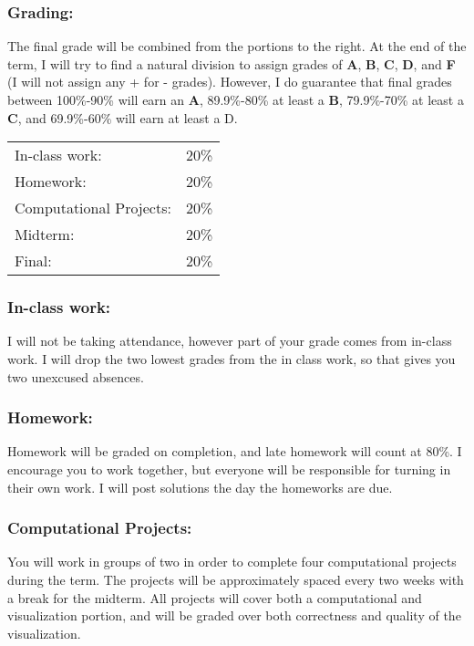 \documentclass[10pt]{article}
\begin{document}
\subsubsection*{Grading:}
\begin{minipage}{0.67\textwidth}
The final grade will be combined from the portions to the right. At the end of the term, I will try to find a natural division to assign grades of {\bf A}, {\bf B}, {\bf C}, {\bf D}, and {\bf F} (I will not assign any + for - grades). However, I do guarantee that final grades between 100\%-90\% will earn an {\bf A}, 89.9\%-80\% at least a {\bf B}, 79.9\%-70\% at least a {\bf C}, and 69.9\%-60\% will earn at least a {D}.
\end{minipage}
\begin{minipage}{0.03\textwidth}
\mbox{\hspace{0.1in}}
\end{minipage}
\begin{minipage}{0.3\textwidth}
\begin{tabular}{ll}
In-class work: & 20\% \\
Homework: & 20\% \\
Computational Projects: & 20\% \\
Midterm: & 20\% \\
Final: & 20\%
\end{tabular}
\end{minipage}

\vspace{-0.1cm}
\subsubsection*{In-class work:}
I will not be taking attendance, however part of your grade comes from in-class work. I will drop the two lowest grades from the in class work, so that gives you two unexcused absences.

\vspace{-0.1cm}
\subsubsection*{Homework:}
Homework will be graded on completion, and late homework will count at 80\%. I encourage you to work together, but everyone will be responsible for turning in their own work. I will post solutions the day the homeworks are due.

\vspace{-0.1cm}
\subsubsection*{Computational Projects:}
You will work in groups of two in order to complete four computational projects during the term. The projects will be approximately spaced every two weeks with a break for the midterm. All projects will cover both a computational and visualization portion, and will be graded over both correctness and quality of the visualization.
\end{document}
